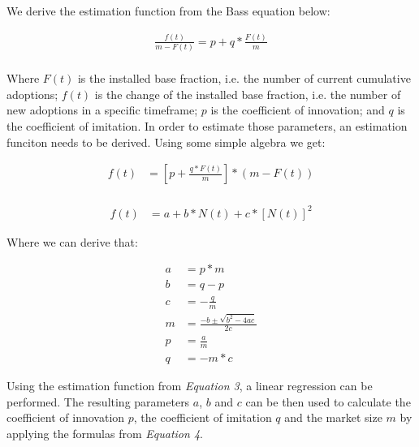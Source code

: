 \documentclass{article}
\begin{document}
\medskip

\noindent We derive the estimation function from the Bass equation below:

\begin{equation} \label{eq1}
    \begin{split}
        \frac{f(t)}{m - F(t)} = p + q * \frac{F(t)}{m}\\
    \end{split}
\end{equation}

\noindent Where $F(t)$ is the installed base fraction, i.e. the number of current cumulative adoptions; $f(t)$ is the change of the installed base
fraction, i.e. the number of new adoptions in a specific timeframe; $p$ is the coefficient of innovation; and $q$ is the coefficient of imitation.
In order to estimate those parameters, an estimation funciton needs to be derived. Using some simple algebra we get:

\begin{equation} \label{eq2}
    \begin{split}
    f(t) & = \left[ p + \frac{q * F(t)}{m} \right] * (m - F(t)) \\
    \end{split}
\end{equation}

\begin{equation} \label{eq3}
    \begin{split}
    f(t) & = a + b * N(t) + c * \left[ N(t) \right]^2
    \end{split}
\end{equation}

\noindent Where we can derive that:

\begin{equation}
    \begin{aligned}
    a & = p*m \\[2pt]
    b & = q - p \\[2pt]
    c & = - \frac{q}{m} \\[15pt]
    m & = \frac{-b \pm \sqrt{b^2 -4ac}}{2c} \\
    p & = \frac{a}{m} \\[2pt]
    q & = -m*c
    \end{aligned}
\end{equation}

\bigskip

\noindent Using the estimation function from \emph{Equation 3}, a linear regression can be performed. The resulting parameters $a$, $b$ and $c$ can be
then used to calculate the coefficient of innovation $p$, the coefficient of imitation $q$ and the market size $m$ by applying the formulas from \emph{Equation 4}.
\end{document}
